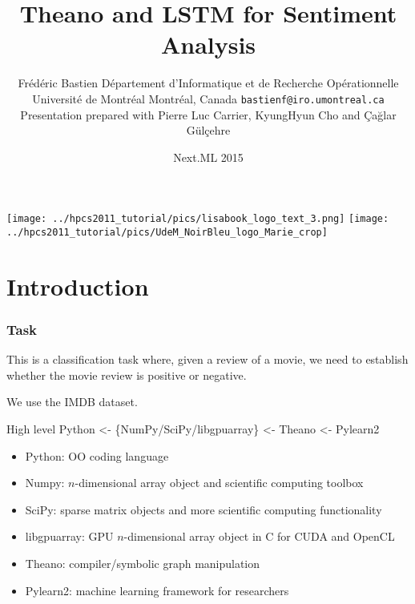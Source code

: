 \documentclass[utf8x,xcolor=pdftex,dvipsnames,table]{beamer}
\title{Theano and LSTM for Sentiment Analysis}
\author{%
\footnotesize
Frédéric Bastien \newline
Département d'Informatique et de Recherche Opérationnelle \newline
Université de Montréal \newline
Montréal, Canada \newline
\texttt{bastienf@iro.umontreal.ca} \newline \newline
Presentation prepared with Pierre Luc Carrier, KyungHyun Cho and \newline
 Çağlar Gülçehre
}
\date{Next.ML 2015}
\begin{document}
\begin{frame}[plain]
 \titlepage
 \vspace{-5em}
 \texttt{[image: ../hpcs2011\_tutorial/pics/lisabook\_logo\_text\_3.png]}
 \hfill
 \texttt{[image: ../hpcs2011\_tutorial/pics/UdeM\_NoirBleu\_logo\_Marie\_crop]}
\end{frame}

\section{Introduction}
\begin{frame}
  \frametitle{Task}

This is a classification task where, given a review of a movie, we
need to establish whether the movie review is positive or negative.

We use the IMDB dataset.
\end{frame}

\begin{frame}
  \tableofcontents[currentsection]
\end{frame}


\begin{frame}{High level}\setcounter{page}{1}
  Python <- \{NumPy/SciPy/libgpuarray\} <- Theano <- Pylearn2
  \begin{itemize}
  \item Python: OO coding language
  \item Numpy: $n$-dimensional array object and scientific computing toolbox
  \item SciPy: sparse matrix objects and more scientific computing functionality
  \item libgpuarray: GPU $n$-dimensional array object in C for CUDA and OpenCL
  \item Theano: compiler/symbolic graph manipulation
  \item Pylearn2: machine learning framework for researchers
  \end{itemize}
\end{frame}

\end{document}

